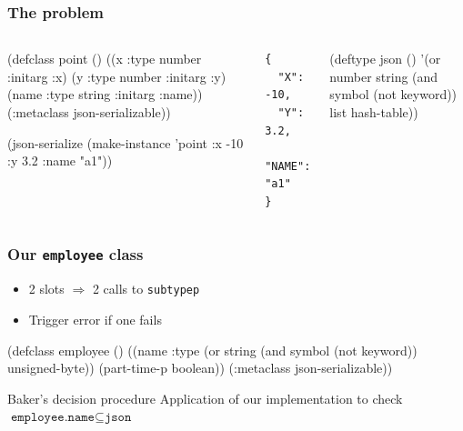 \documentclass[aspectratio=169]{beamer}
\renewcommand\code[1]{\texttt{#1}}
\newcommand\Rarr{\ensuremath{\Rightarrow}}
\begin{document}
\begin{frame}[fragile]
  \frametitle{The problem}
  \begin{columns}
    \column{.55\paperwidth}
\begin{smallclcode}
(defclass point ()
  ((x :type number
      :initarg :x)
   (y :type number
      :initarg :y)
   (name :type string
         :initarg :name))
  (:metaclass json-serializable))

(json-serialize (make-instance 'point
                               :x -10
                               :y 3.2
                               :name "a1"))
\end{smallclcode}

    \pause

    \column{.4\paperwidth}
  \begin{mintedcodebox}[title=JSON serialization,icon=\faOpera,compact]
\begin{verbatim}
{
  "X": -10,
  "Y": 3.2,
  "NAME": "a1"
}
\end{verbatim}
  \end{mintedcodebox}

  \pause

\begin{smallclcode}
(deftype json ()
  '(or number
       string
       (and symbol
            (not keyword))
       list
       hash-table))
\end{smallclcode}
\end{columns}
\end{frame}

\begin{frame}[fragile]
  \frametitle{Our \code{employee} class}
  \begin{itemize}
  \item 2 slots \Rarr{} 2 calls to \code{subtypep}
  \item Trigger error if one fails
  \end{itemize}
\begin{clcode}
(defclass employee ()
  ((name :type (or string
                   (and symbol
                        (not keyword))
                   unsigned-byte))
   (part-time-p boolean))
  (:metaclass json-serializable))
\end{clcode}
\end{frame}

\begin{sectionframe}{Baker's decision procedure}
  Application of our implementation to check\\\smallskip
  $\code{employee.name} \subseteq \code{json}$
\end{sectionframe}
\end{document}
